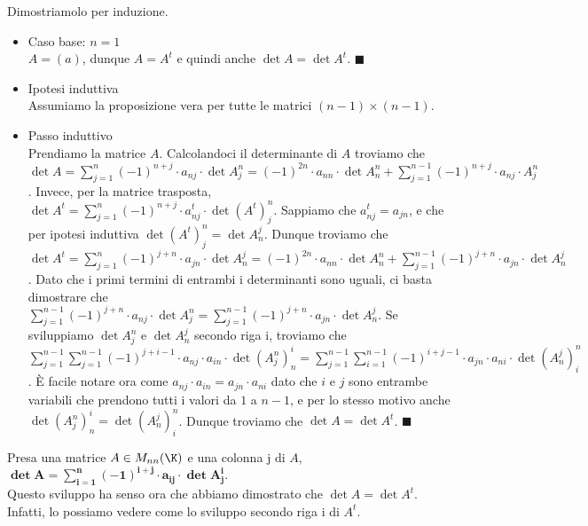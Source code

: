 \documentclass[11pt, a4paper, titlepage, oneside]{scrbook}
\begin{document}
\Dimostrazione \nopagebreak

Dimostriamolo per induzione. 
\begin{itemize}
    \item Caso base: $n = 1$ \\
    $A = (a)$, dunque $A = A^t$ e quindi anche $\det A = \det A^t$. $\blacksquare$ 
    \item Ipotesi induttiva \\
    Assumiamo la proposizione vera per tutte le matrici $(n-1) \times (n-1)$. 
    \item Passo induttivo \\
    Prendiamo la matrice $A$. Calcolandoci il determinante di $A$ troviamo che \mbox{$\det  A = \sum_{j = 1}^n (-1)^{n+j} \cdot a_{nj} \cdot \det A_j^n = (-1)^{2n} \cdot a_{nn} \cdot \det A^n_n + \sum_{j = 1}^{n-1} (-1)^{n+j} \cdot a_{nj} \cdot A_j^n$}.
    Invece, per la matrice trasposta, $\det A^t = \sum_{j = 1}^n (-1)^{n+j} \cdot a_{nj}^t \cdot \det (A^t)_j^n$. Sappiamo che $a^t_{nj} = a_{jn}$, e che per ipotesi induttiva $\det (A^t)^n_j = \det A^j_n$. Dunque troviamo che \mbox{$\det A^t = \sum_{j = 1}^n (-1)^{j+n} \cdot a_{jn} \cdot \det A^j_n = (-1)^{2n} \cdot a_{nn} \cdot \det A_n^n + \sum_{j = 1}^{n-1} (-1)^{j+n} \cdot a_{jn} \cdot \det A^j_n$}. Dato che i primi termini di entrambi i determinanti sono uguali, ci basta dimostrare che $\sum_{j = 1}^{n-1} (-1)^{j+n} \cdot a_{nj} \cdot \det A_j^n = \sum_{j = 1}^{n-1} (-1)^{j+n} \cdot a_{jn} \cdot \det A^j_n$. Se sviluppiamo $\det A^n_j$ e $\det A_n^j$ secondo riga i, troviamo che \mbox{$\sum_{j = 1}^{n-1} \sum_{j = 1}^{n-1} (-1)^{j+i-1} \cdot a_{nj} \cdot a_{in} \cdot \det (A^n_j)^i_n = \sum_{j = 1}^{n-1} \sum_{i = 1}^{n-1} (-1)^{i+j-1} \cdot a_{jn} \cdot a_{ni} \cdot \det (A^j_n)^n_i$}. È facile notare ora come $a_{nj} \cdot a_{in} = a_{jn} \cdot a_{ni}$ dato che $i$ e $j$ sono entrambe variabili che prendono tutti i valori da $1$ a $n-1$, e per lo stesso motivo anche $\det (A_j^n)^i_n  = \det (A_n^j)^n_i$. Dunque troviamo che $\det A = \det A^t$. $\blacksquare$
\end{itemize}

\begin{Definizione}
\label{def-sviluppo di Laplace colonna j}
Presa una matrice $A \in M_{nn}(\K)$ e una colonna j di $A$, $\bm{\det A = \sum_{i = 1}^n (-1)^{i+j} \cdot a_{ij} \cdot \det A^i_j}$. \\
\NB Questo sviluppo ha senso ora che abbiamo dimostrato che $\det A = \det A^t$. Infatti, lo possiamo vedere come lo sviluppo secondo riga i di $A^t$. 
\end{Definizione}
\end{document}
